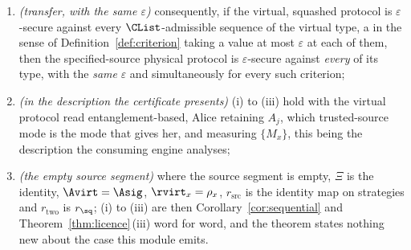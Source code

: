 \begin{theorem}
\begin{enumerate}[label=(\roman*),leftmargin=3.0em]
  finite-dimensional, and Definition~\ref{def:system-setting} makes the
  target space, and let
  $\Hs{\Avirt}$ be finite-dimensional, as it is in both
  cases of : trivially for an ensemble
  declared as matrices, and by its clause (b) for a separable specified
  system. Then every $\Aev^{\mathrm{v},\sq}_j$ of \eqref{eq:twosidedmap}
  lies in the set Definition~\ref{def:attset} assigns to its round, so
  $r_{\mathrm{two}}$ has its image in the strategy set of
  $\mathsf{P}^{\mathrm{v},\sq}_{\CList}$ and is an exact operational reduction
  into it. \emph{No hypothesis on the specified transmitted system is needed}:
  $\Hs{\Asig}$ may be separable and infinite-dimensional, as the transmitted
  system of a source model is, and it is not a register
  Definition~\ref{def:system-setting} or the round model ranges over
  but a system in transit;
\item \emph{(transfer, with the same $\varepsilon$)} consequently, if the
  virtual, squashed protocol is $\varepsilon$-secure against every
  $\CList$-admissible sequence of the virtual type, a  in
  the sense of Definition~\ref{def:criterion} taking a value at most
  $\varepsilon$ at each of them, then the specified-source physical protocol
  is $\varepsilon$-secure against \emph{every}  of its
  type, with the \emph{same} $\varepsilon$ and simultaneously for every such
  criterion;
\item \emph{(in the description the certificate presents)} (i) to (iii) hold
  with the virtual protocol read entanglement-based, Alice retaining $A_j$,
  which trusted-source mode is the mode that gives her, and measuring
  $\{M_x\}$, this being the description the consuming engine analyses;
\item \emph{(the empty source segment)} where the source segment is empty,
  $\Xi$ is the identity, $\Avirt=\Asig$, $\rvirt_x=\rho_x$,
  $r_{\mathrm{src}}$ is the identity map on strategies and $r_{\mathrm{two}}$ is
  $r_{\sq}$; (i) to (iii) are then Corollary~\ref{cor:sequential} and
  Theorem~\ref{thm:licence}\,(iii) word for word, and the theorem states
  nothing new about the case this module emits.
\end{enumerate}
\end{theorem}

